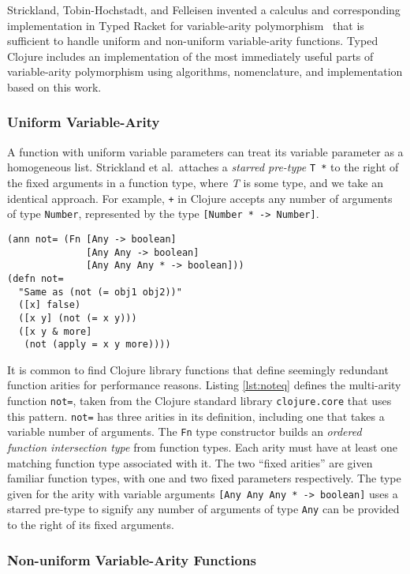 Strickland, Tobin-Hochstadt, and Felleisen invented a calculus and corresponding
implementation in Typed Racket for variable-arity polymorphism~\cite{STF09}
that is sufficient to handle uniform and non-uniform variable-arity functions.
Typed Clojure includes an implementation of the most immediately useful parts of variable-arity
polymorphism using algorithms, nomenclature, and implementation based on this work.

\subsubsection{Uniform Variable-Arity}

A function with uniform variable parameters can treat its variable parameter
as a homogeneous list. 
Strickland et al.\ attaches a \emph{starred pre-type} \lstinline|T *| to the right of the fixed arguments
in a function type, where \emph{T} is some type, and we take an identical approach.
For example, \lstinline|+| in Clojure accepts any number of arguments
of type \lstinline|Number|, represented by the type \lstinline|[Number * -> Number]|.


\begin{lstlisting}[caption=Typing multi-arity functions, label=lst:noteq]
(ann not= (Fn [Any -> boolean]
              [Any Any -> boolean]
              [Any Any Any * -> boolean]))
(defn not=
  "Same as (not (= obj1 obj2))"
  ([x] false)
  ([x y] (not (= x y)))
  ([x y & more]
   (not (apply = x y more))))
\end{lstlisting}

It is common to find Clojure library functions that define seemingly redundant
function arities for performance reasons.
Listing \ref{lst:noteq} defines the multi-arity function \lstinline|not=|,
taken from the Clojure standard library \lstinline|clojure.core| that uses this pattern.
\lstinline|not=| has three arities in its definition, including
one that takes a variable number of arguments.
The \lstinline|Fn| type constructor builds an \emph{ordered function intersection type} from
function types. Each arity must have at least one matching function type associated with it.
The two ``fixed arities'' are given familiar function types, with one and two fixed parameters respectively.
The type given for the arity with variable arguments \lstinline|[Any Any Any * -> boolean]|
uses a starred pre-type to signify any number of arguments of type \lstinline|Any|
can be provided to the right of its fixed arguments.

\subsubsection{Non-uniform Variable-Arity Functions}

